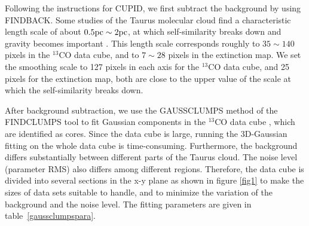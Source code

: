\documentclass[12pt,preprint]{aastex}
\begin{document}
Following the instructions for CUPID, we first subtract the background
by using FINDBACK. Some studies of the Taurus molecular cloud find a
characteristic length scale of about $0.5 {\rm pc}\sim 2{\rm pc}$,
at which self-similarity breaks down and gravity becomes important
\citep{not_fractal}. This length scale corresponds roughly to
$35\sim 140$ pixels in the $^{13}$CO data cube, and to $7\sim 28$ pixels in the extinction map. We set the smoothing
scale to 127 pixels in each axis for
the $^{13}$CO data cube, and 25 pixels for the extinction map,
both are close to the upper value of the scale at which the
self-similarity breaks down.


After background subtraction, we use the GAUSSCLUMPS method of the
FINDCLUMPS tool to fit Gaussian components in the $^{13}$CO data cube
, which are identified as cores. Since the data cube is
large, running the 3D-Gaussian fitting on the whole data cube is time-consuming.
Furthermore, the background
differs substantially between different parts of the Taurus cloud. The noise
level (parameter RMS) also differs among different regions. Therefore,
the data cube is divided into several sections in the x-y plane as
shown in figure \ref{fig1} to make the sizes of data sets suitable to
handle, and to minimize the variation of the background and the noise level.
The fitting parameters are given in table~\ref{gaussclumpspara}.
\end{document}
